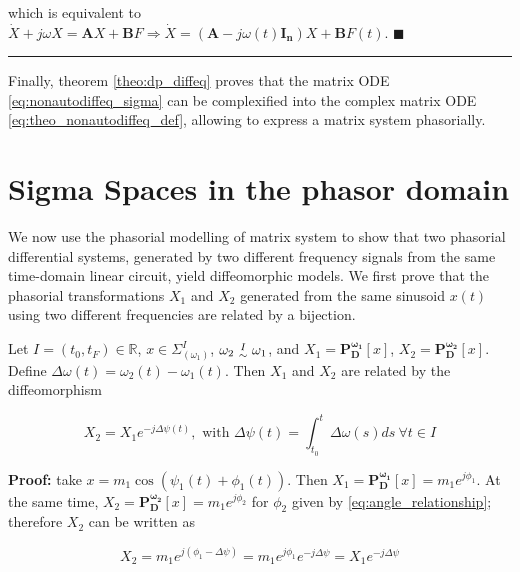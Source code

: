 	\noindent which is equivalent to $\dot{X} + j\omega X = \mathbf{A}X + \mathbf{B}F \Rightarrow \dot{X} = \left(\mathbf{A} - j\omega(t)\mathbf{I_n}\right)X + \mathbf{B}F(t)$. \hfill$\blacksquare$ \vspace{5mm}\hrule\vspace{5mm} %

	Finally, theorem \ref{theo:dp_diffeq} proves that the matrix ODE \eqref{eq:nonautodiffeq_sigma} can be complexified into the complex matrix ODE \eqref{eq:theo_nonautodiffeq_def}, allowing to express a matrix system phasorially.

\section{Sigma Spaces in the phasor domain} %

	We now use the phasorial modelling of matrix system to show that two phasorial differential systems, generated by two different frequency signals from the same time-domain linear circuit, yield diffeomorphic models. We first prove that the phasorial transformations $X_1$ and $X_2$ generated from the same sinusoid $x(t)$ using two different frequencies are related by a bijection.

\begin{theorem} \label{theo:homeomorphic_phasors} %
	Let $I = \left(t_0,t_F\right)\in \mathbb{R}$, $x\in \Sigma^I_{\left(\omega_1\right)}$, $\omega_2\ \substack{ I \\ \sim}\ \omega_1$, and $X_1 = \mathbf{P^{\omega_1}_D}\left[x\right]$, $X_2 = \mathbf{P^{\omega_2}_D}\left[x\right]$. Define $\Delta\omega(t) = \omega_2(t) - \omega_1(t)$. Then $X_1$ and $X_2$ are related by the diffeomorphism

\begin{equation} X_2 = X_1e^{-j\Delta\psi(t)}, \text{ with } \Delta\psi(t) = \int_{t_0}^t \Delta\omega(s)ds\ \forall t\in I \label{eq:x1x2_homeomorphism}\end{equation}
\end{theorem}
\textbf{Proof:} take $x = m_1\cos\left(\psi_1(t) + \phi_1(t)\right)$. Then $X_1 = \mathbf{P_D^{\omega_1}}\left[x\right] = m_1e^{j\phi_1}$. At the same time, $X_2 = \mathbf{P_D^{\omega_2}}\left[x\right] = m_1e^{j\phi_2}$ for $\phi_2$ given by \eqref{eq:angle_relationship}; therefore $X_2$ can be written as

\begin{equation} X_2 = m_1e^{j\left(\phi_1 - \Delta\psi\right)} = m_1e^{j\phi_1}e^{-j\Delta\psi} = X_1e^{-j\Delta\psi}\end{equation}

